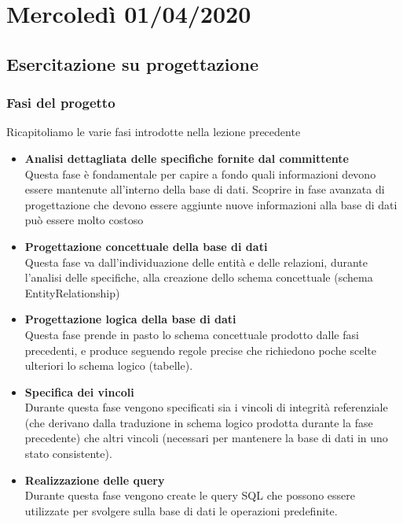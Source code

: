 \chapter{Mercoledì 01/04/2020}
\section{Esercitazione su progettazione}
\small
\subsection{Fasi del progetto}
Ricapitoliamo le varie fasi introdotte nella lezione precedente
\begin{itemize}
	\item \textbf{Analisi dettagliata delle specifiche fornite dal committente}\\ Questa fase è fondamentale per capire a fondo quali informazioni devono essere mantenute all’interno della base di dati. Scoprire in fase avanzata di progettazione che devono essere aggiunte nuove informazioni alla base di dati può essere molto costoso
	\item \textbf{Progettazione concettuale della base di dati}\\  Questa fase va dall’individuazione delle entità e delle relazioni, durante l’analisi delle specifiche, alla creazione dello schema concettuale (schema EntityRelationship)
	\item \textbf{Progettazione logica della base di dati}\\ Questa fase prende in pasto lo schema concettuale prodotto dalle fasi precedenti, e produce seguendo regole precise che richiedono poche scelte ulteriori lo schema logico (tabelle). 
	\item \textbf{Specifica dei vincoli}\\ Durante questa fase vengono specificati sia i vincoli di integrità referenziale (che derivano dalla traduzione in schema logico prodotta durante la fase precedente) che altri vincoli (necessari per mantenere la base di dati in uno stato consistente).
	\item \textbf{Realizzazione delle query}\\ Durante questa fase vengono create le query SQL che possono essere utilizzate per svolgere sulla base di dati le operazioni predefinite. 
\end{itemize}
